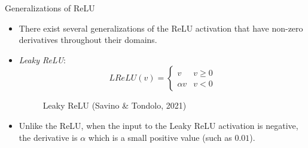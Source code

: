 \begin{frame} {Generalizations of ReLU}
  \begin{itemize}
    \item There exist several generalizations of the ReLU activation that have non-zero derivatives throughout their domains.
    \item \emph{Leaky ReLU}: 
    $$  LReLU(v) = \begin{cases} 
          v & v \geq 0 \\
          \alpha v & v < 0 
       \end{cases} $$
    \begin{figure}
      \centering
        \caption{Leaky ReLU (Savino \& Tondolo, 2021)}
    \end{figure}
    \item Unlike the ReLU, when the input to the Leaky ReLU activation is negative, the derivative is $\alpha$ which is a small positive value (such as $0.01$).
  \end{itemize}
\end{frame}

